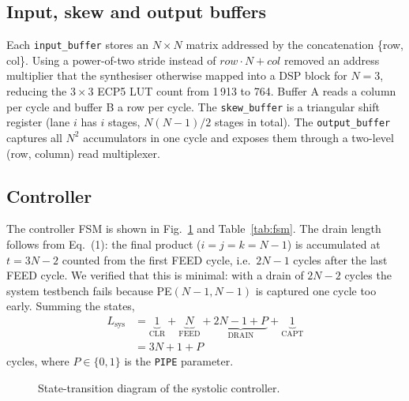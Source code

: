 \documentclass[conference]{IEEEtran}
\begin{document}
\subsection{Input, skew and output buffers}
Each \texttt{input\_buffer} stores an $N\times N$ matrix addressed by the
concatenation \{row, col\}. Using a power-of-two stride instead of
$\textit{row}\cdot N+\textit{col}$ removed an address multiplier that the
synthesiser otherwise mapped into a DSP block for $N=3$, reducing the
$3\times3$ ECP5 LUT count from 1\,913 to 764. Buffer A reads a column per
cycle and buffer B a row per cycle. The \texttt{skew\_buffer} is a
triangular shift register (lane $i$ has $i$ stages, $N(N-1)/2$ stages in
total). The \texttt{output\_buffer} captures all $N^2$ accumulators in one
cycle and exposes them through a two-level (row, column) read multiplexer.

\subsection{Controller}
The controller FSM is shown in Fig.~\ref{fig:fsm} and Table~\ref{tab:fsm}.
The drain length follows from Eq.~(1): the final product ($i=j=k=N-1$) is
accumulated at $t=3N-2$ counted from the first FEED cycle, i.e.\ $2N-1$ cycles
after the last FEED cycle. We verified that this is minimal: with a drain of
$2N-2$ cycles the system testbench fails because PE$(N-1,N-1)$ is captured one
cycle too early. Summing the states,
\begin{equation}
\begin{aligned}
L_{\text{sys}} &= \underbrace{1}_{\text{CLR}} + \underbrace{N}_{\text{FEED}} + \underbrace{2N-1+P}_{\text{DRAIN}} + \underbrace{1}_{\text{CAPT}}\\
&= 3N+1+P
\end{aligned}
\end{equation}
cycles, where $P\in\{0,1\}$ is the \texttt{PIPE} parameter.

\begin{figure}[t]
\centering
{}
\caption{State-transition diagram of the systolic controller.}
\label{fig:fsm}
\end{figure}
\end{document}

